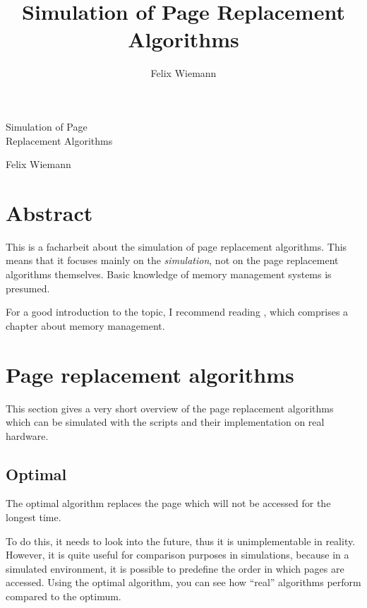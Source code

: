 \documentclass[a4paper,12pt,BCOR2cm,DIV12]{scrartcl}
\author{Felix Wiemann}
\title{Simulation of Page Replacement Algorithms}
\begin{document}
\newpage

\begin{center}
{
  \thispagestyle{empty}

  \vspace*{3cm}
  
  \Huge
  Simulation of Page\\
  Replacement Algorithms

  \vspace{3cm}

  \Large
  Felix Wiemann

}
\end{center}

\newpage

\thispagestyle{empty}

\tableofcontents

\newpage

\section{Abstract}

This is a facharbeit about the simulation of page replacement
algorithms.  This means that it focuses mainly on the
\emph{simulation}, not on the page replacement algorithms themselves.
Basic knowledge of memory management systems is presumed.

For a good introduction to the topic, I recommend reading
\cite{Tan01}, which comprises a chapter about memory management.

\section{Page replacement algorithms}

This section gives a very short overview of the page replacement
algorithms which can be simulated with the scripts and their
implementation on real hardware.

\subsection{Optimal}

The optimal algorithm replaces the page which will not be accessed for
the longest time.

To do this, it needs to look into the future, thus it is
unimplementable in reality.  However, it is quite useful for
comparison purposes in simulations, because in a simulated
environment, it is possible to predefine the order in which pages are
accessed.  Using the optimal algorithm, you can see how ``real''
algorithms perform compared to the optimum.
\end{document}
